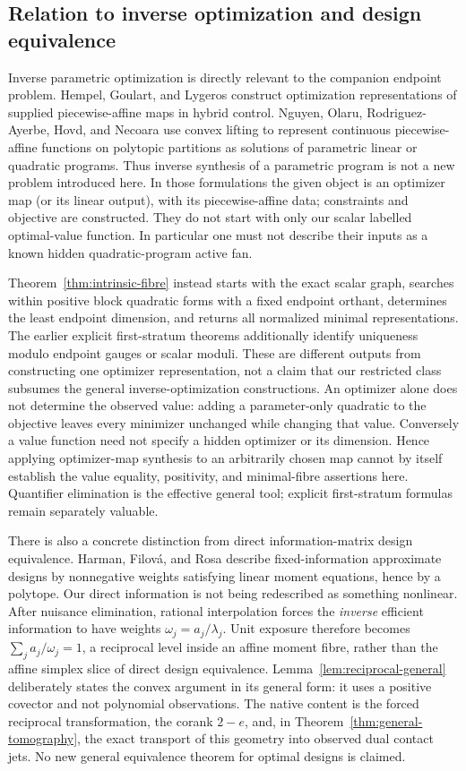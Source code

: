 \subsection{Relation to inverse optimization and design equivalence}
Inverse parametric optimization is directly relevant to the companion endpoint problem. Hempel, Goulart, and Lygeros \cite{HGL} construct optimization representations of supplied piecewise-affine maps in hybrid control. Nguyen, Olaru, Rodriguez-Ayerbe, Hovd, and Necoara \cite{NORHN} use convex lifting to represent continuous piecewise-affine functions on polytopic partitions as solutions of parametric linear or quadratic programs. Thus inverse synthesis of a parametric program is not a new problem introduced here. In those formulations the given object is an optimizer map (or its linear output), with its piecewise-affine data; constraints and objective are constructed. They do not start with only our scalar labelled optimal-value function. In particular one must not describe their inputs as a known hidden quadratic-program active fan.

Theorem~\ref{thm:intrinsic-fibre} instead starts with the exact scalar graph, searches within positive block quadratic forms with a fixed endpoint orthant, determines the least endpoint dimension, and returns all normalized minimal representations. The earlier explicit first-stratum theorems additionally identify uniqueness modulo endpoint gauges or scalar moduli. These are different outputs from constructing one optimizer representation, not a claim that our restricted class subsumes the general inverse-optimization constructions. An optimizer alone does not determine the observed value: adding a parameter-only quadratic to the objective leaves every minimizer unchanged while changing that value. Conversely a value function need not specify a hidden optimizer or its dimension. Hence applying optimizer-map synthesis to an arbitrarily chosen map cannot by itself establish the value equality, positivity, and minimal-fibre assertions here. Quantifier elimination is the effective general tool; explicit first-stratum formulas remain separately valuable.

There is also a concrete distinction from direct information-matrix design equivalence. Harman, Filov\'a, and Rosa \cite[Lemma 1]{HFR} describe fixed-information approximate designs by nonnegative weights satisfying linear moment equations, hence by a polytope. Our direct information is not being redescribed as something nonlinear. After nuisance elimination, rational interpolation forces the \emph{inverse} efficient information to have weights $\omega_j=a_j/\lambda_j$. Unit exposure therefore becomes $\sum_j a_j/\omega_j=1$, a reciprocal level inside an affine moment fibre, rather than the affine simplex slice of direct design equivalence. Lemma~\ref{lem:reciprocal-general} deliberately states the convex argument in its general form: it uses a positive covector and not polynomial observations. The native content is the forced reciprocal transformation, the corank $2-e$, and, in Theorem~\ref{thm:general-tomography}, the exact transport of this geometry into observed dual contact jets. No new general equivalence theorem for optimal designs is claimed.

